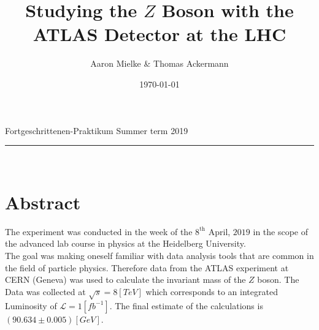 \documentclass[12pt, a4paper, bibliography=totoc]{scrartcl}
\title{Studying the $Z$ Boson with the ATLAS Detector at the LHC}
\author{Aaron Mielke \& Thomas Ackermann}
\date{\today}
\begin{document}
\begin{center}
	\makeatletter
	\thispagestyle{empty}
	\large{Fortgeschrittenen-Praktikum}
\hfill
	 \vspace{-5mm}
    \large{Summer term 2019} 
    \rule{\textwidth}{0.2pt}
    \Huge\textbf{\@title} \\
	\large{\@author}
	\makeatother
\end{center}
\section*{Abstract}
The experiment was conducted in the week of the $8^\text{th}$ April, $2019$ in the scope of the advanced lab course in physics at the Heidelberg University. \\
The goal was making oneself familiar with data analysis tools that are common in the field of particle physics.
Therefore data from the ATLAS experiment at CERN (Geneva) was used to calculate the invariant mass of the $Z$ boson.
The Data was collected at $\sqrt{s} = 8 \si{[TeV]}$ which corresponds to an integrated Luminosity of $\mathcal{L} = 1 \si{[fb^{-1}]}$.
The final estimate of the calculations is $(90.634 \pm 0.005 )\si{[GeV]}$.
\tableofcontents
\newpage
\end{document}
